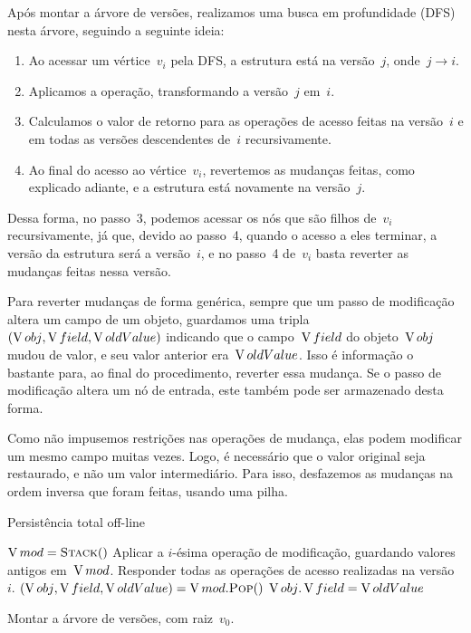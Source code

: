 \documentclass[main.tex]{subfiles}
\begin{document}
Após montar a árvore de versões, realizamos uma busca em profundidade (DFS) nesta árvore, seguindo a seguinte ideia:
\begin{enumerate}
	\item Ao acessar um vértice~$v_i$ pela DFS, a estrutura está na versão~$j$, onde~$j \rightarrow i$.
	\item Aplicamos a operação, transformando a versão~$j$ em~$i$.
	\item Calculamos o valor de retorno para as operações de acesso feitas na versão~$i$ e em todas as versões descendentes de~$i$ recursivamente.
	\item Ao final do acesso ao vértice~$v_i$, revertemos as mudanças feitas, como explicado adiante, e a estrutura está novamente na versão~$j$.
\end{enumerate}

Dessa forma, no passo~3, podemos acessar os nós que são filhos de~$v_i$ recursivamente, já que, devido ao passo~4, quando o acesso a eles terminar, a versão da estrutura será a versão~$i$, e no passo~4 de~$v_i$ basta reverter as mudanças feitas nessa versão.

Para reverter mudanças de forma genérica, sempre que um passo de modificação altera um campo de um objeto, guardamos uma tripla~$(\operatorname{V}{obj}, \operatorname{V}{field}, \operatorname{V}{oldValue})$ indicando que o campo~$\operatorname{V}{field}$ do objeto~$\operatorname{V}{obj}$ mudou de valor, e seu valor anterior era~$\operatorname{V}{oldValue}$. Isso é informação o bastante para, ao final do procedimento, reverter essa mudança. Se o passo de modificação altera um nó de entrada, este também pode ser armazenado desta forma.

Como não impusemos restrições nas operações de mudança, elas podem modificar um mesmo campo muitas vezes. Logo, é necessário que o valor original seja restaurado, e não um valor intermediário. Para isso, desfazemos as mudanças na ordem inversa que foram feitas, usando uma pilha.

\begin{algorithm}
\caption{Persistência total off-line} \label{lst:geraloffline}
\begin{algorithmic}[1]

	\State $\V{mod} = \Call{Stack}{\null}$
	\State Aplicar a $i$-ésima operação de modificação, guardando valores antigos em~$\operatorname{V}{mod}$.\label{line:off:opmod}
	\State Responder todas as operações de acesso realizadas na versão~$i$. \label{line:off:opac}
	 \label{line:off:for}
		\State {}
	\EndFor
	 \label{line:off:while}
		\State $(\V{obj}, \V{field}, \V{oldValue}) = \V{mod}.\Call{Pop}{\null}$
		\State $\operatorname{V}{obj}.\operatorname{V}{field} = \operatorname{V}{oldValue}$
	\EndWhile
\EndFunction

	\State Montar a árvore de versões, com raiz~$v_0$.
	\State {}
\EndFunction

\end{algorithmic}
\end{algorithm}
\end{document}
